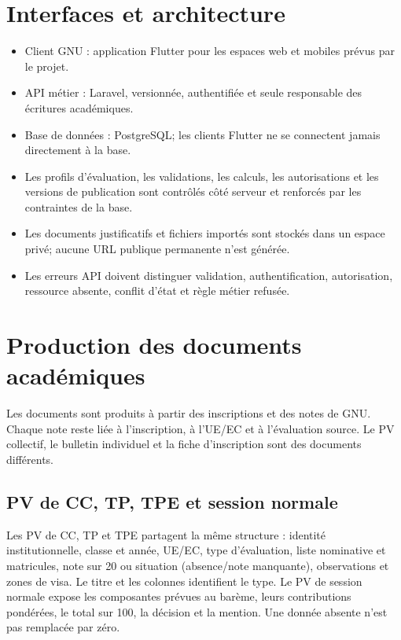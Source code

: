 \documentclass[11pt,a4paper]{article}
\begin{document}
\section{Interfaces et architecture}

\begin{itemize}
  \item Client GNU : application Flutter pour les espaces web et mobiles prévus par le projet.
  \item API métier : Laravel, versionnée, authentifiée et seule responsable des écritures académiques.
  \item Base de données : PostgreSQL; les clients Flutter ne se connectent jamais directement à la base.
  \item Les profils d'évaluation, les validations, les calculs, les autorisations et les versions de publication sont contrôlés côté serveur et renforcés par les contraintes de la base.
  \item Les documents justificatifs et fichiers importés sont stockés dans un espace privé; aucune URL publique permanente n'est générée.
  \item Les erreurs API doivent distinguer validation, authentification, autorisation, ressource absente, conflit d'état et règle métier refusée.
\end{itemize}

\section{Production des documents académiques}

Les documents sont produits à partir des inscriptions et des notes de GNU. Chaque note reste liée à l’inscription, à l’UE/EC et à l’évaluation source. Le PV collectif, le bulletin individuel et la fiche d’inscription sont des documents différents.

\subsection{PV de CC, TP, TPE et session normale}
Les PV de CC, TP et TPE partagent la même structure : identité institutionnelle, classe et année, UE/EC, type d’évaluation, liste nominative et matricules, note sur 20 ou situation (absence/note manquante), observations et zones de visa. Le titre et les colonnes identifient le type. Le PV de session normale expose les composantes prévues au barème, leurs contributions pondérées, le total sur 100, la décision et la mention. Une donnée absente n’est pas remplacée par zéro.
\end{document}
